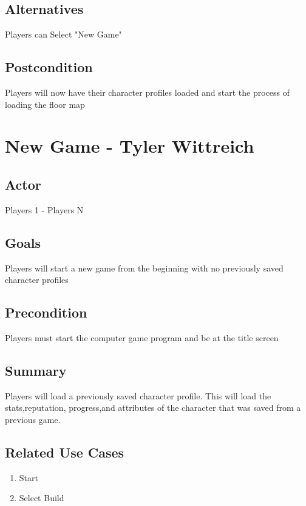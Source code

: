 \documentclass[10pt]{article}
\begin{document}
		\subsection{Alternatives}
			Players can Select "New Game"
			
		\subsection{Postcondition}
			Players will now have their character profiles loaded and start the process of loading the floor map








\newpage






\section{New Game - Tyler Wittreich}

		\subsection{Actor}
		Players 1 - Players N
		
		
		\subsection{Goals}
 		Players will start a new game from the beginning with no previously saved character profiles  

		\subsection{Precondition}
 		Players must start the computer game program and be at the title screen

		\subsection{Summary}
			Players will load a previously saved character profile. This will load the stats,reputation, progress,and attributes of the character that was saved from a previous game.
			
		\subsection{Related Use Cases}
		     \begin{enumerate}
			    \item Start
			    \item Select Build
			 \end{enumerate}
\end{document}
